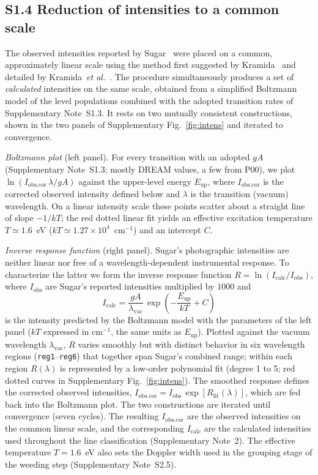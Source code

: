 \documentclass[10pt]{article}
\begin{document}
\subsection*{S1.4 Reduction of intensities to a common scale}
\label{ssec:intens}
The observed intensities reported by Sugar~\cite{Sugar1969,Sugar1974} were
placed on a common, approximately linear scale using the method first
suggested by Kramida~\cite{Kramida_2013FuST_63_313} and detailed by
Kramida~\textit{et al.}~\cite{Kramida2022_ApJS}. The procedure simultaneously
produces a set of \emph{calculated} intensities on the same scale, obtained
from a simplified Boltzmann model of the level populations combined with the
adopted transition rates of Supplementary Note~S1.3. It rests on two mutually
consistent constructions, shown in the two panels of
Supplementary Fig.~\ref{fig:intens} and iterated to convergence.

\emph{Boltzmann plot} (left panel). For every transition with an adopted $gA$
(Supplementary Note~S1.3; mostly DREAM values, a few from P00), we plot
$\ln(I_{\mathrm{obs.cor}}\,\lambda/gA)$ against the upper-level energy
$E_{\mathrm{up}}$, where $I_{\mathrm{obs.cor}}$ is the corrected observed
intensity defined below and $\lambda$ is the transition (vacuum) wavelength.
On a linear intensity scale these points scatter about a straight line of
slope $-1/kT$; the red dotted linear fit yields an effective excitation
temperature $T\simeq1.6$~eV ($kT\simeq1.27\times10^{4}$~cm$^{-1}$) and an
intercept $C$.

\emph{Inverse response function} (right panel). Sugar's photographic
intensities are neither linear nor free of a wavelength-dependent
instrumental response. To characterize the latter we form the inverse
response function $R=\ln(I_{\mathrm{calc}}/I_{\mathrm{obs}})$, where
$I_{\mathrm{obs}}$ are Sugar's reported intensities multiplied by $1000$ and
\begin{equation}
I_{\mathrm{calc}} = \frac{gA}{\lambda_{\mathrm{vac}}}\,
\exp\!\left(-\frac{E_{\mathrm{up}}}{kT} + C\right)
\label{eq:Icalc}
\end{equation}
is the intensity predicted by the Boltzmann model with the parameters of the
left panel ($kT$ expressed in cm$^{-1}$, the same units as $E_{\mathrm{up}}$).
Plotted against the vacuum wavelength $\lambda_{\mathrm{vac}}$, $R$ varies
smoothly but with distinct behavior in six wavelength regions
(\texttt{reg1}--\texttt{reg6}) that together span Sugar's combined range;
within each region $R(\lambda)$ is represented by a low-order polynomial fit
(degree 1 to 5; red dotted curves in Supplementary Fig.~\ref{fig:intens}). The
smoothed response defines the corrected observed intensities,
$I_{\mathrm{obs.cor}} = I_{\mathrm{obs}}\,\exp[R_{\mathrm{fit}}(\lambda)]$,
which are fed back into the Boltzmann plot. The two constructions are iterated
until convergence (seven cycles). The resulting $I_{\mathrm{obs.cor}}$ are the
observed intensities on the common linear scale, and the corresponding
$I_{\mathrm{calc}}$ are the calculated intensities used throughout the line
classification (Supplementary Note~2). The effective temperature $T=1.6$~eV
also sets the Doppler width used in the grouping stage of the weeding step
(Supplementary Note~S2.5).
\end{document}
